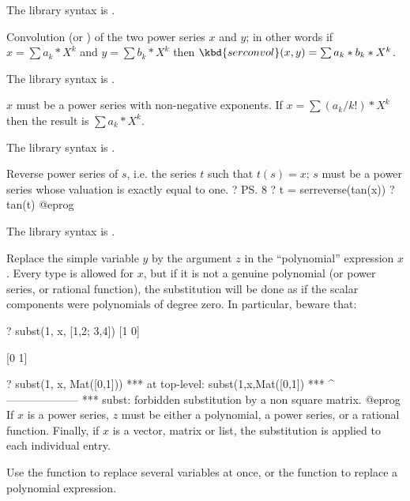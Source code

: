 
The library syntax is .

\label{se:serconvol}
Convolution (or ) of the
two power series $x$ and $y$; in other words if $x=\sum a_k*X^k$ and $y=\sum
b_k*X^k$ then $\kbd{serconvol}(x,y)=\sum a_k*b_k*X^k$.

The library syntax is .

\label{se:serlaplace}
$x$ must be a power series with non-negative
exponents. If $x=\sum (a_k/k!)*X^k$ then the result is $\sum a_k*X^k$.

The library syntax is .

\label{se:serreverse}
Reverse power series of $s$, i.e. the series $t$ such that $t(s) = x$;
$s$ must be a power series whose valuation is exactly equal to one.
\bprog
? \ps 8
? t = serreverse(tan(x))
? tan(t)
@eprog

The library syntax is .

\label{se:subst}
Replace the simple variable $y$ by the argument $z$ in the ``polynomial''
expression $x$. Every type is allowed for $x$, but if it is not a genuine
polynomial (or power series, or rational function), the substitution will be
done as if the scalar components were polynomials of degree zero. In
particular, beware that:

\bprog
? subst(1, x, [1,2; 3,4])
[1 0]

[0 1]

? subst(1, x, Mat([0,1]))
  ***   at top-level: subst(1,x,Mat([0,1])
  ***                 ^--------------------
  *** subst: forbidden substitution by a non square matrix.
@eprog\noindent
If $x$ is a power series, $z$ must be either a polynomial, a power
series, or a rational function. Finally, if $x$ is a vector,
matrix or list, the substitution is applied to each individual entry.

Use the function  to replace several variables at once,
or the function  to replace a polynomial expression.

